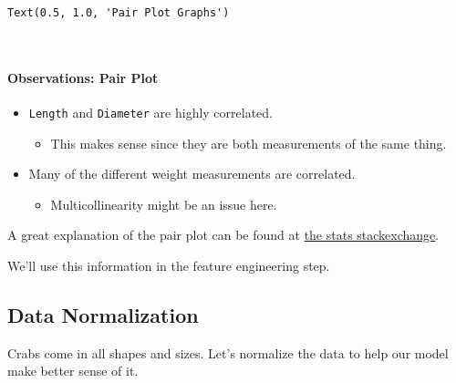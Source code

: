 \documentclass[11pt]{article}
\makeatletter
\providecommand{\tightlist}{%
      \setlength{\itemsep}{0pt}\setlength{\parskip}{0pt}}
\newcommand{\boxspacing}{\kern\kvtcb@left@rule\kern\kvtcb@boxsep}
\newcommand{\prompt}[4]{
        {\ttfamily\llap{{\color{#2}[#3]:\hspace{3pt}#4}}\vspace{-\baselineskip}}
    }
\makeatother
\begin{document}
            \begin{tcolorbox}[breakable, size=fbox, boxrule=.5pt, pad at break*=1mm, opacityfill=0]
\prompt{Out}{outcolor}{14}{\boxspacing}
\begin{Verbatim}[commandchars=\\\{\}]
Text(0.5, 1.0, 'Pair Plot Graphs')
\end{Verbatim}
\end{tcolorbox}
        
    \begin{center}
    \end{center}
    { \hspace*{\fill} \\}
    
    \paragraph{Observations: Pair Plot}\label{observations-pair-plot}

\begin{itemize}
\tightlist
\item
  \texttt{Length} and \texttt{Diameter} are highly correlated.

  \begin{itemize}
  \tightlist
  \item
    This makes sense since they are both measurements of the same thing.
  \end{itemize}
\item
  Many of the different weight measurements are correlated.

  \begin{itemize}
  \tightlist
  \item
    Multicollinearity might be an issue here.
  \end{itemize}
\end{itemize}

A great explanation of the pair plot can be found at
\href{https://stats.stackexchange.com/a/636122}{the stats
stackexchange}.

We'll use this information in the feature engineering step.

    \subsection{Data Normalization}\label{data-normalization}

Crabs come in all shapes and sizes. Let's normalize the data to help our
model make better sense of it.
\end{document}
